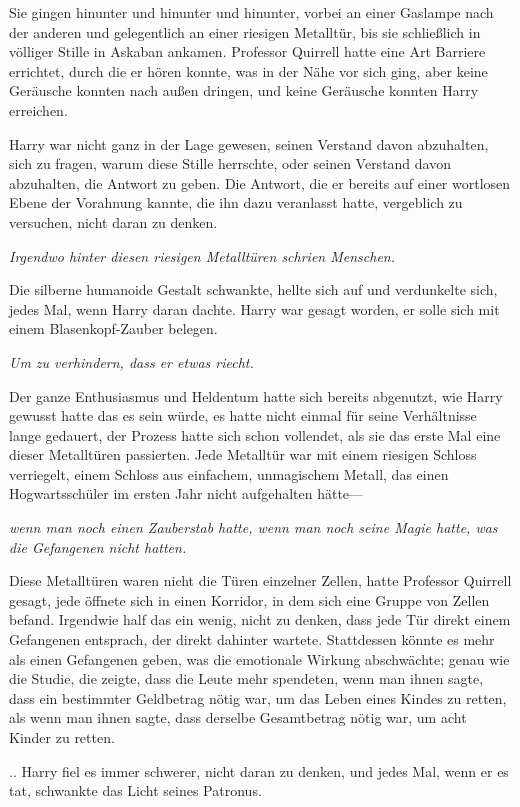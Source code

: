 {Sie gingen hinunter und hinunter und hinunter, vorbei an einer Gaslampe nach der anderen und gelegentlich an einer riesigen Metalltür, bis sie schließlich in völliger Stille in Askaban ankamen. Professor Quirrell hatte eine Art Barriere errichtet, durch die er hören konnte, was in der Nähe vor sich ging, aber keine Geräusche konnten nach außen dringen, und keine Geräusche konnten Harry erreichen.

Harry war nicht ganz in der Lage gewesen, seinen Verstand davon abzuhalten, sich zu fragen, warum diese Stille herrschte, oder seinen Verstand davon abzuhalten, die Antwort zu geben. Die Antwort, die er bereits auf einer wortlosen Ebene der Vorahnung kannte, die ihn dazu veranlasst hatte, vergeblich zu versuchen, nicht daran zu denken.

\emph{Irgendwo hinter diesen riesigen Metalltüren schrien Menschen.}

Die silberne humanoide Gestalt schwankte, hellte sich auf und verdunkelte sich, jedes Mal, wenn Harry daran dachte. Harry war gesagt worden, er solle sich mit einem Blasenkopf-Zauber belegen.

\emph{Um zu verhindern, dass er etwas riecht.}

Der ganze Enthusiasmus und Heldentum hatte sich bereits abgenutzt, wie Harry gewusst hatte das es sein würde, es hatte nicht einmal für seine Verhältnisse lange gedauert, der Prozess hatte sich schon vollendet, als sie das erste Mal eine dieser Metalltüren passierten. Jede Metalltür war mit einem riesigen Schloss verriegelt, einem Schloss aus einfachem, unmagischem Metall, das einen Hogwartsschüler im ersten Jahr nicht aufgehalten hätte—

\emph{wenn man noch einen Zauberstab hatte, wenn man noch seine Magie hatte, was die Gefangenen nicht hatten.}

Diese Metalltüren waren nicht die Türen einzelner Zellen, hatte Professor Quirrell gesagt, jede öffnete sich in einen Korridor, in dem sich eine Gruppe von Zellen befand. Irgendwie half das ein wenig, nicht zu denken, dass jede Tür direkt einem Gefangenen entsprach, der direkt dahinter wartete. Stattdessen könnte es mehr als einen Gefangenen geben, was die emotionale Wirkung abschwächte; genau wie die Studie, die zeigte, dass die Leute mehr spendeten, wenn man ihnen sagte, dass ein bestimmter Geldbetrag nötig war, um das Leben eines Kindes zu retten, als wenn man ihnen sagte, dass derselbe Gesamtbetrag nötig war, um acht Kinder zu retten.

.. Harry fiel es immer schwerer, nicht daran zu denken, und jedes Mal, wenn er es tat, schwankte das Licht seines Patronus.

}
